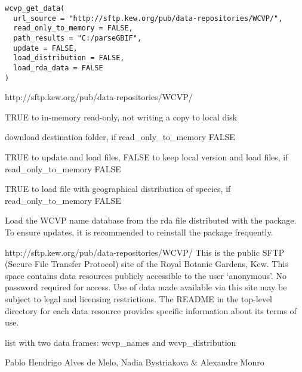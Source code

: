 \documentclass[a4paper]{book}
\begin{document}
%
\begin{Usage}
\begin{verbatim}
wcvp_get_data(
  url_source = "http://sftp.kew.org/pub/data-repositories/WCVP/",
  read_only_to_memory = FALSE,
  path_results = "C:/parseGBIF",
  update = FALSE,
  load_distribution = FALSE,
  load_rda_data = FALSE
)
\end{verbatim}
\end{Usage}
%
\begin{Arguments}
\begin{ldescription}
\item[\code{url\_source}] http://sftp.kew.org/pub/data-repositories/WCVP/

\item[\code{read\_only\_to\_memory}] TRUE to in-memory read-only, not writing a copy to local disk

\item[\code{path\_results}] download destination folder, if read\_only\_to\_memory FALSE

\item[\code{update}] TRUE to update and load files, FALSE to keep local version and load files, if read\_only\_to\_memory FALSE

\item[\code{load\_distribution}] TRUE to load file with geographical distribution of species, if read\_only\_to\_memory FALSE

\item[\code{load\_rda\_data}] Load the WCVP name database from the rda file distributed with the package. To ensure updates, it is recommended to reinstall the package frequently.
\end{ldescription}
\end{Arguments}
%
\begin{Details}
http://sftp.kew.org/pub/data-repositories/WCVP/ This is the public SFTP (Secure File Transfer Protocol) site of the Royal Botanic Gardens, Kew. This space contains data resources publicly accessible to the user `anonymous'.  No password required for access. Use of data made available via this site may be subject to legal and licensing restrictions. The README in the top-level directory for each data resource provides specific information about its terms of use.
\end{Details}
%
\begin{Value}
list with two data frames: wcvp\_names and wcvp\_distribution
\end{Value}
%
\begin{Author}
Pablo Hendrigo Alves de Melo,
Nadia Bystriakova \&
Alexandre Monro
\end{Author}
\end{document}
